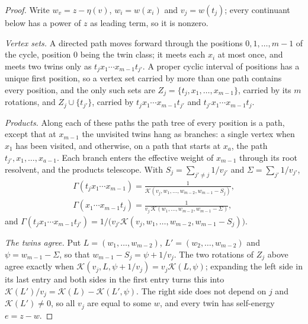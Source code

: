 \documentclass[11pt]{amsart}
\theoremstyle{plain}
\theoremstyle{definition}
\theoremstyle{remark}
\numberwithin{equation}{section}
\newcommand{\cont}{\mathcal{K}}           %
\begin{document}
\begin{proof}
Write $w_v=z-\eta(v)$, $w_i=w(x_i)$ and $v_j=w(t_j)$; every continuant below has a power of $z$ as leading term, so it is nonzero.

\emph{Vertex sets.} A directed path moves forward through the positions $0,1,\dots,m-1$ of the cycle, position $0$ being the twin class; it meets each $x_i$ at most once, and meets two twins only as $t_jx_1\cdots x_{m-1}t_{j'}$. A proper cyclic interval of positions has a unique first position, so a vertex set carried by more than one path contains every position, and the only such sets are $Z_j=\{t_j,x_1,\dots,x_{m-1}\}$, carried by its $m$ rotations, and $Z_j\cup\{t_{j'}\}$, carried by $t_jx_1\cdots x_{m-1}t_{j'}$ and $t_{j'}x_1\cdots x_{m-1}t_j$.

\emph{Products.} Along each of these paths the path tree of every position is a path, except that at $x_{m-1}$ the unvisited twins hang as branches: a single vertex when $x_1$ has been visited, and otherwise, on a path that starts at $x_a$, the path $t_{j'},x_1,\dots,x_{a-1}$. Each branch enters the effective weight of $x_{m-1}$ through its root resolvent, and the products telescope. With $S_j=\sum_{j'\neq j}1/v_{j'}$ and $\Sigma=\sum_{j'}1/v_{j'}$,
\begin{gather*}
\Gamma(t_jx_1\cdots x_{m-1})=\frac{1}{\cont(v_j,w_1,\dots,w_{m-2},w_{m-1}-S_j)},\\
\Gamma(x_1\cdots x_{m-1}t_j)=\frac{1}{v_j\,\cont(w_1,\dots,w_{m-2},w_{m-1}-\Sigma)},
\end{gather*}
and $\Gamma(t_jx_1\cdots x_{m-1}t_{j'})=1/\bigl(v_{j'}\cont(v_j,w_1,\dots,w_{m-2},w_{m-1}-S_j)\bigr)$.

\emph{The twins agree.} Put $L=(w_1,\dots,w_{m-2})$, $L'=(w_2,\dots,w_{m-2})$ and $\psi=w_{m-1}-\Sigma$, so that $w_{m-1}-S_j=\psi+1/v_j$. The two rotations of $Z_j$ above agree exactly when $\cont(v_j,L,\psi+1/v_j)=v_j\cont(L,\psi)$; expanding the left side in its last entry and both sides in the first entry turns this into $\cont(L')/v_j=\cont(L)-\cont(L',\psi)$. The right side does not depend on $j$ and $\cont(L')\neq0$, so all $v_j$ are equal to some $w$, and every twin has self-energy $e=z-w$.


\end{proof}
\end{document}

